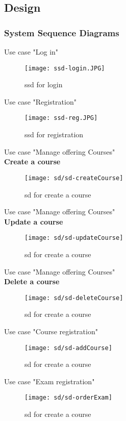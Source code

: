 \documentclass{scrartcl}
\begin{document}
\subsection{Design}
\subsubsection{System Sequence Diagrams}
 Use case "Log in"
\begin{figure}[H]
\centering
\texttt{[image: ssd-login.JPG]}
\caption{ssd for login}
\label{ssd for login}
\end{figure}


Use case "Registration"
\begin{figure}[H]
\centering
\texttt{[image: ssd-reg.JPG]}
\caption{ssd for registration}
\label{ssd for registration}
\end{figure}

\newpage
Use case "Manage offering Courses"\\
\textbf{Create a course}
\begin{figure}[H]
\centering
\texttt{[image: sd/sd-createCourse]}
\caption{sd for create a course }
\label{sd for create a course}
\end{figure}

Use case "Manage offering Courses"\\
\textbf{Update a course}
\begin{figure}[H]
\centering
\texttt{[image: sd/sd-updateCourse]}
\caption{sd for create a course }
\label{sd for update a course}
\end{figure}

\newpage
Use case "Manage offering Courses"\\
\textbf{Delete a course}
\begin{figure}[H]
\centering
\texttt{[image: sd/sd-deleteCourse]}
\caption{sd for create a course }
\label{sd for delete a course}
\end{figure}

Use case "Course registration"\\

\begin{figure}[H]
\centering
\texttt{[image: sd/sd-addCourse]}
\caption{sd for create a course }
\label{sd for course registration}
\end{figure}

\newpage
Use case "Exam registration"\\
\begin{figure}[H]
\centering
\texttt{[image: sd/sd-orderExam]}
\caption{sd for create a course }
\label{sd for exam registration}
\end{figure}
\end{document}
